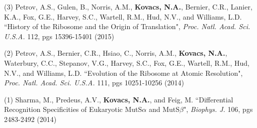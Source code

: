 \begin{cvpublications}

\cvpublication
{(3) Petrov, A.S., Gulen, B., Norris, A.M., \textbf{Kovacs, N.A.}, Bernier, C.R., Lanier, K.A., Fox, G.E., Harvey, S.C., Wartell, R.M., Hud, N.V., and Williams, L.D. ``History of the Ribosome and the Origin of Translation", \textit{Proc. Natl. Acad. Sci. U.S.A.} 112, pgs 15396-15401 (2015)}
\vspace{-4.0mm}


\cvpublication
{(2) Petrov, A.S., Bernier, C.R., Hsiao, C., Norris, A.M., \textbf{Kovacs, N.A.}, Waterbury, C.C., Stepanov, V.G., Harvey, S.C., Fox, G.E., Wartell, R.M., Hud, N.V., and Williams, L.D. ``Evolution of the Ribosome at Atomic Resolution", \textit{Proc. Natl. Acad. Sci. U.S.A.} 111, pgs 10251-10256 (2014)}
\vspace{-4.0mm}


\cvpublication
{(1) Sharma, M., Predeus, A.V., \textbf{Kovacs, N.A.}, and Feig, M. ``Differential Recognition Specificities of Eukaryotic MutS$\alpha$ and MutS$\beta$", \textit{Biophys. J.} 106, pgs 2483-2492 (2014)}
\vspace{-7.5mm}

\end{cvpublications}
